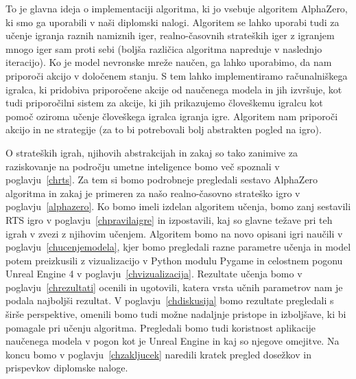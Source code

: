 \documentclass[a4paper, 12pt]{book}
\begin{document}
To je glavna ideja o implementaciji algoritma, ki jo vsebuje algoritem AlphaZero, ki smo ga uporabili v naši diplomski nalogi.
Algoritem se lahko uporabi tudi za učenje igranja raznih namiznih iger, realno-časovnih strateških iger z igranjem mnogo iger sam proti sebi (boljša različica algoritma napreduje v naslednjo iteracijo).
Ko je model nevronske mreže naučen, ga lahko uporabimo, da nam priporoči akcijo v določenem stanju.
S tem lahko implementiramo računalniškega igralca, ki pridobiva priporočene akcije od naučenega modela in jih izvršuje, kot tudi priporočilni sistem za akcije, ki jih prikazujemo človeškemu igralcu kot pomoč oziroma učenje človeškega igralca igranja igre. 
Algoritem nam priporoči akcijo in ne strategije (za to bi potrebovali bolj abstrakten pogled na igro). 

O strateških igrah, njihovih abstrakcijah in zakaj so tako zanimive za raziskovanje na področju umetne inteligence bomo več spoznali v poglavju~\ref{chrts}.
Za tem si bomo podrobneje pregledali sestavo AlphaZero algoritma in zakaj je primeren za našo realno-časovno strateško igro v poglavju~\ref{alphazero}.
Ko bomo imeli izdelan algoritem učenja, bomo zanj sestavili RTS igro v poglavju~\ref{chpravilaigre} in izpostavili, kaj so glavne težave pri teh igrah v zvezi z njihovim učenjem.
Algoritem bomo na novo opisani igri naučili v poglavju~\ref{chucenjemodela}, kjer bomo pregledali razne parametre učenja in model potem preizkusili z vizualizacijo v Python modulu Pygame in celostnem pogonu Unreal Engine 4 v poglavju~\ref{chvizualizacija}.
Rezultate učenja bomo v poglavju~\ref{chrezultati} ocenili in ugotovili, katera vrsta učnih parametrov nam je podala najboljši rezultat.
V poglavju~\ref{chdiskusija} bomo rezultate pregledali s širše perspektive, omenili bomo tudi možne nadaljnje pristope in izboljšave, ki bi pomagale pri učenju algoritma. 
Pregledali bomo tudi koristnost aplikacije naučenega modela v pogon kot je Unreal Engine in kaj so njegove omejitve.
Na koncu bomo v poglavju~\ref{chzakljucek} naredili kratek pregled dosežkov in prispevkov diplomske naloge.

\end{document}
